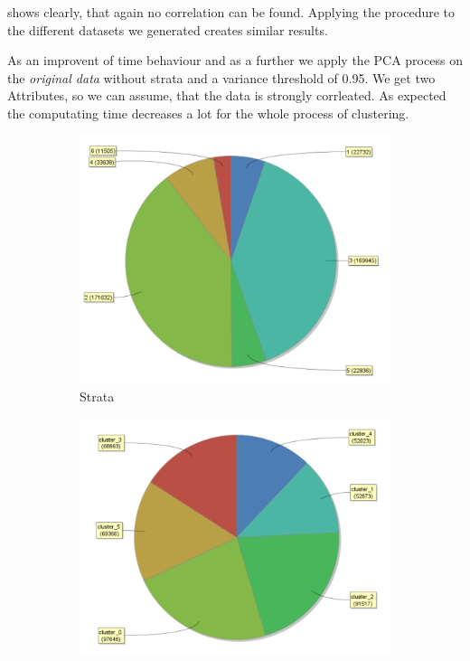  shows clearly, that again no correlation can be found. Applying the procedure to the different datasets we generated creates similar results.



As an improvent of time behaviour and as a further we apply the PCA process on the \textit{original data} without strata and a variance
threshold of 0.95. We get two Attributes, so we can assume, that the data is strongly corrleated. As expected the computating time decreases a lot for the whole process of clustering. 


\begin{figure}[H]
\vspace*{-1em}
\centering
\begin{subfigure}{.3\textwidth}
  \centering
  \includegraphics[width=.9\linewidth]{ClusterPCAOrigRapidStrata.PNG}
  \caption{Strata}
  \label{fig:PCAOrgSt}
\end{subfigure}%
\begin{subfigure}{.3\textwidth}
  \centering
  \includegraphics[width=.9\linewidth]{ClusterPCAOrigRapidCluster.PNG}

\end{subfigure}
\end{figure}
